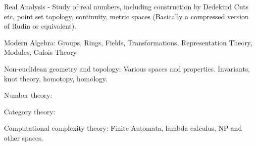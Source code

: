 \documentclass{book}
\begin{document}
    Real Analysis - Study of real numbers, including construction by Dedekind Cuts etc, point set topology, continuity, metric spaces (Basically a compressed version of Rudin or equivalent).


    Modern Algebra:  Groups, Rings, Fields, Transformations, Representation Theory, Modules, Galois Theory


    Non-euclidean geometry and topology:  Various spaces and properties.  Invariants, knot theory, homotopy, homology.


    Number theory:


    Category theory:


    Computational complexity theory:  Finite Automata, lambda calculus, NP and other spaces.
    
\tableofcontents




\end{document}
